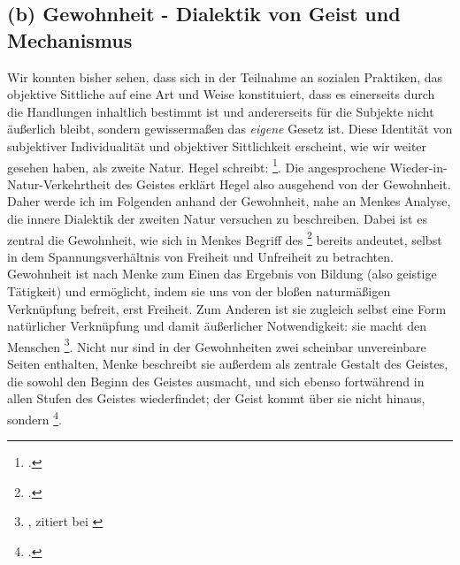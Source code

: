 \documentclass[12pt, a4paper, openany]{report}
\begin{document}
\subsection{(b) Gewohnheit - Dialektik von Geist und Mechanismus}
Wir konnten bisher sehen, dass sich in der Teilnahme an sozialen Praktiken, das objektive Sittliche auf eine Art und Weise konstituiert, dass es einerseits durch die Handlungen inhaltlich bestimmt ist und andererseits für die Subjekte nicht äußerlich bleibt, sondern gewissermaßen das \emph{eigene} Gesetz ist. 
Diese Identität von subjektiver Individualität und objektiver Sittlichkeit erscheint, wie wir weiter gesehen haben, als zweite Natur.
Hegel schreibt: \footcite[][§ 151, S. 166]{hegel_grundlinien_2017}.
Die angesprochene Wieder-in-Natur-Verkehrtheit des Geistes erklärt Hegel also ausgehend von der Gewohnheit.
Daher werde ich im Folgenden anhand der Gewohnheit, nahe an Menkes Analyse, die innere Dialektik der zweiten Natur versuchen zu beschreiben.
Dabei ist es zentral die Gewohnheit, wie sich in Menkes Begriff des \footcite[][145]{menke_autonomie_2018} bereits andeutet, selbst in dem Spannungsverhältnis von Freiheit und Unfreiheit zu betrachten. 
Gewohnheit ist nach Menke zum Einen das Ergebnis von Bildung (also geistige Tätigkeit) und ermöglicht, indem sie uns von der bloßen naturmäßigen Verknüpfung befreit, erst Freiheit.
Zum Anderen ist sie zugleich selbst eine Form natürlicher Verknüpfung und damit äußerlicher Notwendigkeit: 
sie macht den Menschen \footnote{, zitiert bei \cite[][127]{menke_autonomie_2018}}.
Nicht nur sind in der Gewohnheiten zwei scheinbar unvereinbare Seiten enthalten, Menke beschreibt sie außerdem als zentrale Gestalt des Geistes, die sowohl den Beginn des Geistes ausmacht, und sich ebenso fortwährend in allen Stufen des Geistes wiederfindet; 
der Geist kommt über sie nicht hinaus, sondern \footcite[][129]{menke_autonomie_2018}.

\begin{comment}
Während Khurana Gewohnheit wesentlich ausgehend von dem Werden des Geistes beschreibt und sie deshalb vor allem den elementaren Stufen des Geistes zuordnet, macht auch dieser deutlich, dass Gewohnheit eine allumfassende Seinsweise des Geistes ist, die sich nicht nur auf den elementaren Stufen, sondern auch in der Sittlichkeit zeigt.\footcite[Vgl.][433]{khurana_freiheit_2017}\todo{Im Falle von Kürzungsnotwendigkeit weglassen}
\end{comment}
\end{document}
